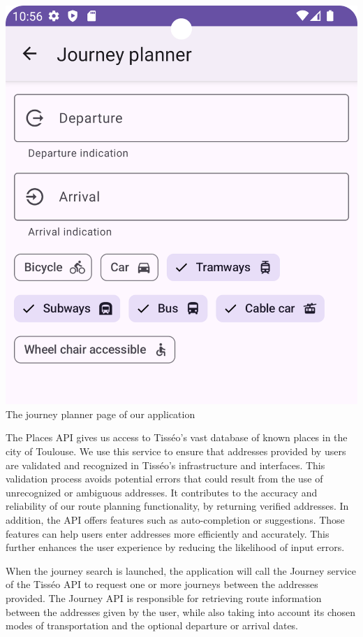 \begin{center}
\includegraphics[scale=0.25]{content/journey.png}
\newline
The journey planner page of our application
\newline
\end{center}

The Places API gives us access to Tisséo's vast database of known places in the city of Toulouse. We use this service to ensure that addresses provided by users are validated and recognized in Tisséo's infrastructure and interfaces. This validation process avoids potential errors that could result from the use of unrecognized or ambiguous addresses. It contributes to the accuracy and reliability of our route planning functionality, by returning verified addresses.
In addition, the API offers features such as auto-completion or suggestions. Those features can help users enter addresses more efficiently and accurately. This further enhances the user experience by reducing the likelihood of input errors.\newline

When the journey search is launched, the application will call the Journey service of the Tisséo API to request one or more journeys between the addresses provided. The Journey API is responsible for retrieving route information between the addresses given by the user, while also taking into account its chosen modes of transportation and the optional departure or arrival dates.\newline

